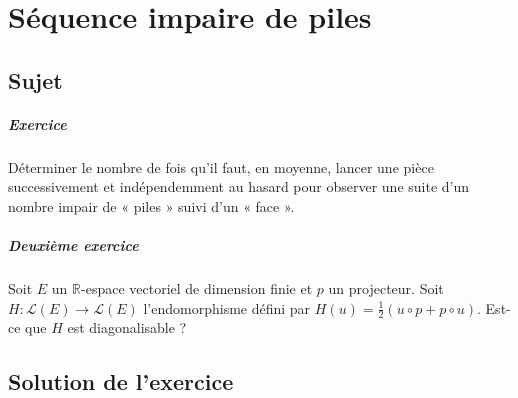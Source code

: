 \chapter{Séquence impaire de piles}

\section{Sujet}
\paragraph{Exercice}
Déterminer le nombre de fois qu'il faut, en moyenne, lancer une pièce
successivement et indépendemment au hasard pour observer une suite d'un
nombre impair de « piles » suivi d'un « face ».

\paragraph{Deuxième exercice}

Soit $E$ un $\mathbb R$-espace vectoriel de dimension finie et $p$ un projecteur. Soit $H:\mathscr L(E) \to \mathscr L(E)$ l’endomorphisme défini par $H(u) =\frac12(u\circ p+p\circ u)$. Est-ce que $H$ est diagonalisable ?

\section{Solution de l'exercice} %




